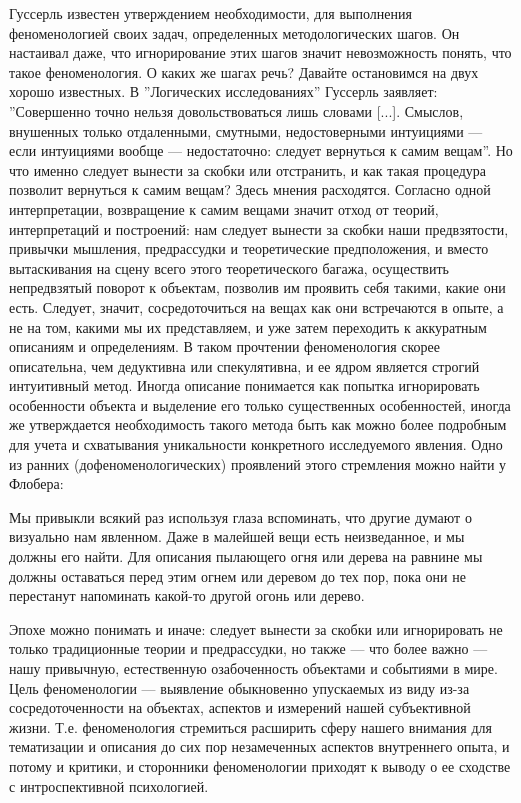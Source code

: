 \documentclass[11pt]{book}
\begin{document}
Гуссерль известен утверждением необходимости, для выполнения феноменологией своих задач, определенных методологических шагов. Он настаивал даже, что игнорирование этих шагов значит невозможность понять, что такое феноменология. О каких же шагах речь? Давайте остановимся на двух хорошо известных. В ''Логических исследованиях'' Гуссерль заявляет: ''Совершенно точно нельзя довольствоваться лишь словами [...]. Смыслов, внушенных только отдаленными, смутными, недостоверными интуициями --- если интуициями вообще --- недостаточно: следует вернуться к самим вещам''. Но что именно следует вынести за скобки или отстранить, и как такая процедура позволит вернуться к самим вещам? Здесь мнения расходятся. Согласно одной интерпретации, возвращение к самим вещами значит отход от теорий, интерпретаций и построений: нам следует вынести за скобки наши предвзятости, привычки мышления, предрассудки и теоретические предположения, и вместо вытаскивания на сцену всего этого теоретического багажа, осуществить непредвзятый поворот к объектам, позволив им проявить себя такими, какие они есть. Следует, значит, сосредоточиться на вещах как они встречаются в опыте, а не на том, какими мы их представляем, и уже затем переходить к аккуратным описаниям и определениям. В таком прочтении феноменология скорее описательна, чем дедуктивна или спекулятивна, и ее ядром является строгий интуитивный метод. Иногда описание понимается как попытка игнорировать особенности объекта и выделение его только существенных особенностей, иногда же утверждается необходимость такого метода быть как можно более подробным для учета и схватывания уникальности конкретного исследуемого явления. Одно из ранних (дофеноменологических) проявлений этого стремления можно найти у Флобера:

\smallskip
{}\relax
{}\relax

Мы привыкли всякий раз используя глаза вспоминать, что другие думают о визуально нам явленном. Даже в малейшей вещи есть неизведанное, и мы должны его найти. Для описания пылающего огня или дерева на равнине мы должны оставаться перед этим огнем или деревом до тех пор, пока они не перестанут напоминать какой-то другой огонь или дерево.

\relax
{}\relax
\smallskip

Эпохе можно понимать и иначе: следует вынести за скобки или игнорировать не только традиционные теории и предрассудки, но также --- что более важно --- нашу привычную, естественную озабоченность объектами и событиями в мире. Цель феноменологии --- выявление обыкновенно упускаемых из виду из-за сосредоточенности на объектах, аспектов и измерений нашей субъективной жизни. Т.е. феноменология стремиться расширить сферу нашего внимания для тематизации и описания до сих пор незамеченных аспектов внутреннего опыта, и потому и критики, и сторонники феноменологии приходят к выводу о ее сходстве с интроспективной психологией.
\end{document}
